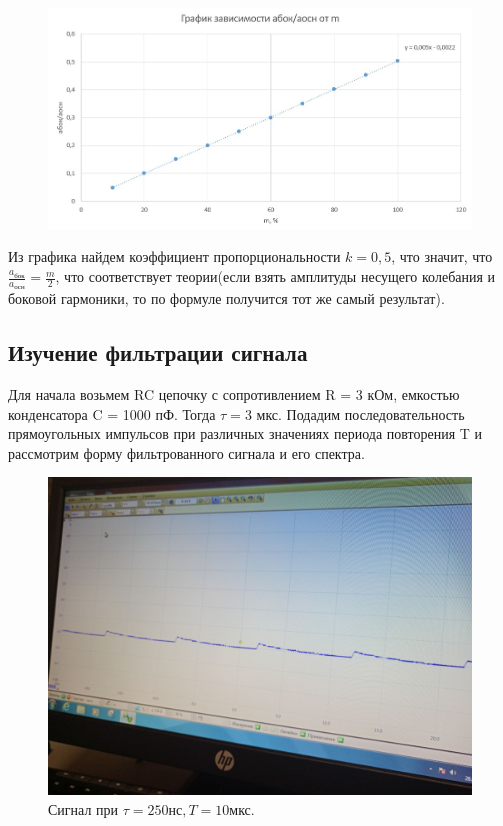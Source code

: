 \documentclass[a4paper,12pt]{article}
\begin{document}
\begin{figure}[H]
	\begin{center}
    \includegraphics[width=.8\textwidth]{G.23.graph}
\label{fig:foobar}
	\end{center}
\end{figure}

Из графика найдем коэффициент пропорциональности $k = 0,5$, что значит, что $\frac{a_\text{бок}}{a_\text{осн}} = \frac{m}{2}$, что соответствует теории(если взять амплитуды несущего колебания и боковой гармоники, то по формуле получится тот же самый результат).

\subsection*{Изучение фильтрации сигнала}
Для начала возьмем RC цепочку с сопротивлением R = 3 кОм, емкостью конденсатора C = 1000 пФ. Тогда $\tau = 3$ мкс. Подадим последовательность прямоугольных импульсов при различных значениях периода повторения T и рассмотрим форму фильтрованного сигнала и его спектра.

\begin{figure}[H]
\begin{center}
    \includegraphics[width=.5\textwidth]{E.30.1.graph}
    \caption{Сигнал при $\tau = 250 \text{нс}, T = 10 \text{мкс}.$}\label{fig:foobar}
\end{center}
\end{figure}
\end{document}

